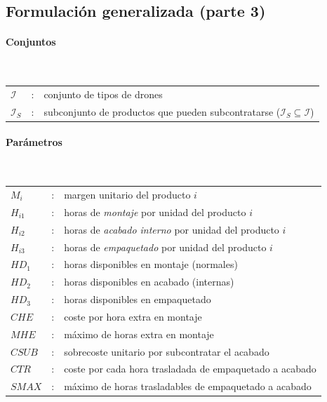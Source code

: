 \subsection{Formulación generalizada (parte 3)}

\paragraph{Conjuntos}\mbox{}\\
\begin{tabular}{lcl}
$\mathcal{I}$      & : & conjunto de tipos de drones \\
$\mathcal{I}_S$    & : & subconjunto de productos que pueden subcontratarse ($\mathcal{I}_S \subseteq \mathcal{I}$) \\
\end{tabular}

\paragraph{Parámetros}\mbox{}\\
\begin{tabular}{lcl}
$M_i$     & : & margen unitario del producto $i$ \\
$H_{i1}$  & : & horas de \emph{montaje} por unidad del producto $i$ \\
$H_{i2}$  & : & horas de \emph{acabado interno} por unidad del producto $i$ \\
$H_{i3}$  & : & horas de \emph{empaquetado} por unidad del producto $i$ \\
$HD_1$    & : & horas disponibles en montaje (normales) \\
$HD_2$    & : & horas disponibles en acabado (internas) \\
$HD_3$    & : & horas disponibles en empaquetado \\
$CHE$     & : & coste por hora extra en montaje \\
$MHE$     & : & máximo de horas extra en montaje \\
$CSUB$    & : & sobrecoste unitario por subcontratar el acabado \\
$CTR$     & : & coste por cada hora trasladada de empaquetado a acabado \\
$SMAX$    & : & máximo de horas trasladables de empaquetado a acabado \\
\end{tabular}

